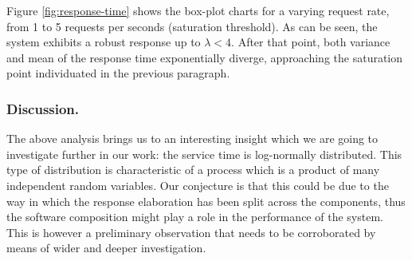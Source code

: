 Figure \ref{fig:response-time} shows the box-plot charts for a varying
request rate, from 1 to 5 requests per seconds (saturation threshold). As can
be seen, the system exhibits a robust response up to $\lambda <
4$. After that point, both variance and mean of the response time
exponentially diverge, approaching the saturation point individuated
in the previous paragraph.

\subsubsection{Discussion.}
The above analysis brings us to an interesting insight which we are going
to investigate further in our work: the service time is log-normally distributed. This type
of distribution is characteristic of a process which is a product of many independent random variables. Our conjecture is that this could be due to the way in which the response elaboration has been split across the components, thus the software composition might play a role in the performance
of the system. This is however a preliminary observation that needs to be corroborated by means of  wider and deeper investigation.

